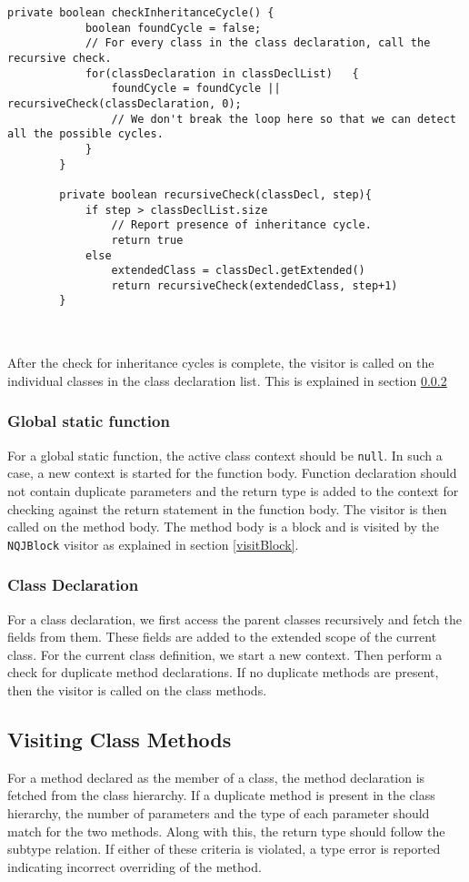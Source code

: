 \documentclass[]{tukportfolio}
\begin{document}
\begin{lstlisting}[caption={Checking inheritance cycle in the class declaration list},captionpos=b,label={checkInheritanceCycle}]
		private boolean checkInheritanceCycle() {
			boolean foundCycle = false;
			// For every class in the class declaration, call the recursive check.
			for(classDeclaration in classDeclList)   {
				foundCycle = foundCycle || recursiveCheck(classDeclaration, 0);
				// We don't break the loop here so that we can detect all the possible cycles.
			}
		}
		
		private boolean recursiveCheck(classDecl, step){
			if step > classDeclList.size
				// Report presence of inheritance cycle.
				return true
			else
				extendedClass = classDecl.getExtended()
				return recursiveCheck(extendedClass, step+1)
		}
	
\end{lstlisting}~\\
After the check for inheritance cycles is complete, the visitor is called on the individual classes  in the class declaration list. This is explained in section \ref{classDeclDesc}

\subsubsection{Global static function}\label{funcDeclDesc}
For a global static function, the active class context should be \lstinline|null|. In such a case, a new context is started for the function body. Function declaration should not contain duplicate parameters and the return type is added to the context for checking against the return statement in the function body. The visitor is then called on the method body. The method body is a block and is visited by the \lstinline|NQJBlock| visitor as explained in section \ref{visitBlock}.

\subsubsection{Class Declaration}\label{classDeclDesc}
For a class declaration, we first access the parent classes recursively and fetch the fields from them. These fields are added to the extended scope of the current class. For the current class definition, we start a new context. Then perform a check for duplicate method declarations. If no duplicate methods are present, then the visitor is called on the class methods.

\subsection{Visiting Class Methods}
For a method declared as the member of a class, the method declaration is fetched from the class hierarchy. If a duplicate method is present in the class hierarchy, the number of parameters and the type of each parameter should match for the two methods. Along with this, the return type should follow the subtype relation. If either of these criteria is violated, a type error is reported indicating incorrect overriding of the method. 
\end{document}
